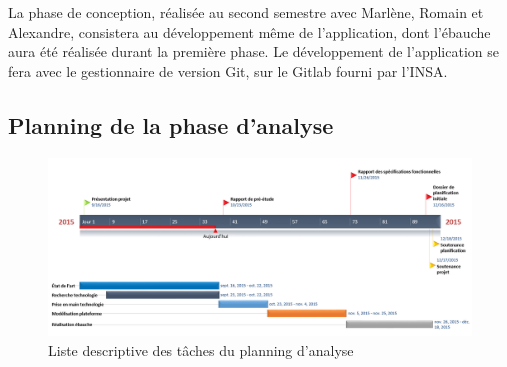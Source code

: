     La phase de conception, réalisée au second semestre avec Marlène, Romain et Alexandre, consistera au développement
    même de l’application, dont l’ébauche aura été réalisée durant la première phase. Le développement de l’application
    se fera avec le gestionnaire de version Git,  sur le Gitlab fourni par l’INSA.

    \pagebreak

    \subsection{Planning de la phase d’analyse}
    \label{subsec:planing}

    \begin{figure}[H]
        \centering
        \includegraphics[width=1.3\textwidth, angle=90]{figure/timeline.png}
            \caption{Liste descriptive des tâches du planning d'analyse}
            \label{fig:description}
    \end{figure}

